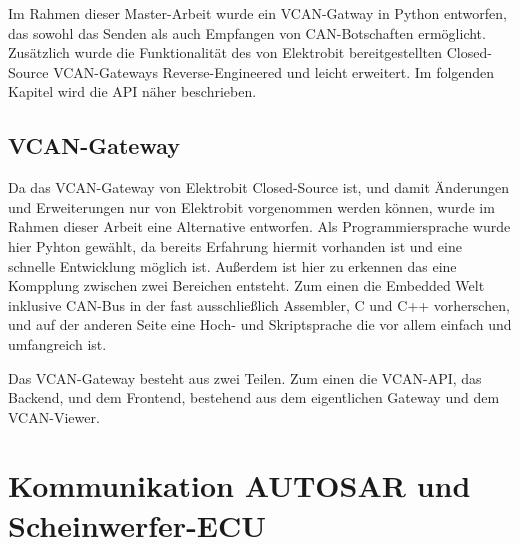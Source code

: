 \documentclass[
  a4paper,					    %
  twoside,
  DIV=calc,     				%
  bibliography=totoc,
  cleardoublepage=empty,
  ngerman,     					%
  final       					%
]{scrbook}
\begin{document}
Im Rahmen dieser Master-Arbeit wurde ein VCAN-Gatway in Python entworfen, das sowohl das Senden als auch Empfangen von CAN-Botschaften ermöglicht. Zusätzlich wurde die Funktionalität des von Elektrobit bereitgestellten Closed-Source VCAN-Gateways Reverse-Engineered und leicht erweitert. Im folgenden Kapitel wird die API näher beschrieben.



\subsection{VCAN-Gateway}
\label{sec:VCAN_Gateway}
Da das VCAN-Gateway von Elektrobit Closed-Source ist, und damit Änderungen und Erweiterungen nur von Elektrobit vorgenommen werden können, wurde im Rahmen dieser Arbeit eine Alternative entworfen. Als Programmiersprache wurde hier Pyhton gewählt, da bereits Erfahrung hiermit vorhanden ist und eine schnelle Entwicklung möglich ist. Außerdem ist hier zu erkennen das eine Kompplung zwischen zwei Bereichen entsteht. Zum einen die Embedded Welt inklusive CAN-Bus in der fast ausschließlich Assembler, C und C++ vorherschen, und auf der anderen Seite eine Hoch- und Skriptsprache die vor allem einfach und umfangreich ist.

Das VCAN-Gateway besteht aus zwei Teilen. Zum einen die VCAN-API, das Backend, und dem Frontend, bestehend aus dem eigentlichen Gateway und dem VCAN-Viewer.













\section{Kommunikation AUTOSAR und Scheinwerfer-ECU}
\label{sec:Kommunikation_A_S}
\end{document}
